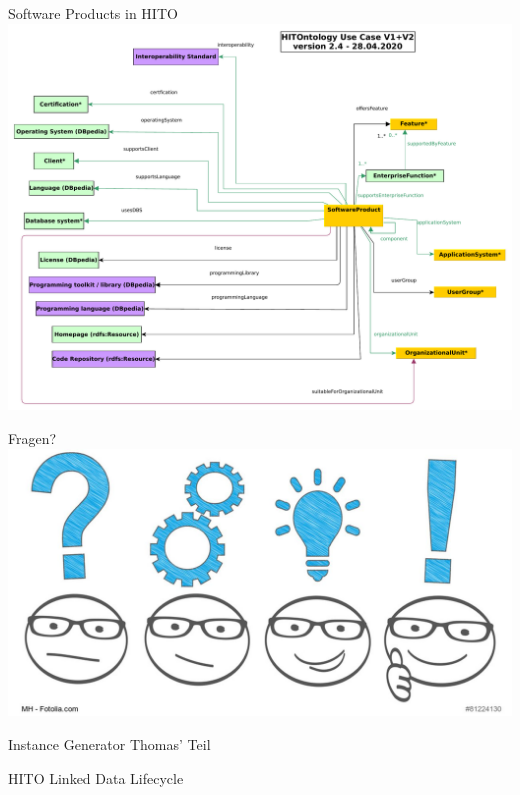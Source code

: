 \documentclass[aspectratio=1610,12pt]{beamer}
\begin{document}
\begin{frame}{Software Products in HITO}
\centering
\includegraphics[height=.8\textheight]{img/excerpt2.pdf}
\end{frame}

\begin{frame}{Fragen?}
  \centering
  \vspace{-0.5cm}
  \includegraphics[width=\textwidth]{img/fragen.png}
\end{frame}

\begin{frame}{Instance Generator}
  \centering
  \huge Thomas' Teil
\end{frame}
\begin{frame}{HITO Linked Data Lifecycle}
  \centering
  \vspace{-0.5cm}
\end{frame}
\end{document}
